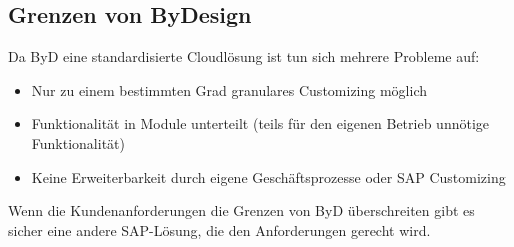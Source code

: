 \documentclass{handout}
\begin{document}
\subsection{Grenzen von ByDesign}

Da ByD eine standardisierte Cloudlösung ist tun sich mehrere Probleme auf:

\begin{itemize}
\item Nur zu einem bestimmten Grad granulares Customizing möglich
\item Funktionalität in Module unterteilt (teils für den eigenen Betrieb unnötige Funktionalität)
\item Keine Erweiterbarkeit durch eigene Geschäftsprozesse oder SAP Customizing
\end{itemize}

Wenn die Kundenanforderungen die Grenzen von ByD überschreiten gibt es sicher eine andere SAP-Lösung, die den Anforderungen gerecht wird.


\newpage


\end{document}
